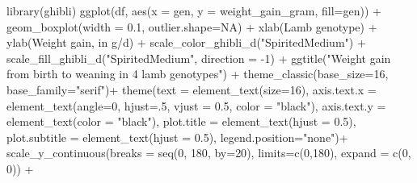 \documentclass[
  letterpaper,
  DIV=11,
  numbers=noendperiod]{scrreprt}
\newenvironment{Shaded}{\begin{snugshade}}{\end{snugshade}}
\newcommand{\AttributeTok}[1]{\textcolor[rgb]{0.40,0.45,0.13}{#1}}
\newcommand{\ConstantTok}[1]{\textcolor[rgb]{0.56,0.35,0.01}{#1}}
\newcommand{\DecValTok}[1]{\textcolor[rgb]{0.68,0.00,0.00}{#1}}
\newcommand{\FloatTok}[1]{\textcolor[rgb]{0.68,0.00,0.00}{#1}}
\newcommand{\FunctionTok}[1]{\textcolor[rgb]{0.28,0.35,0.67}{#1}}
\newcommand{\NormalTok}[1]{\textcolor[rgb]{0.00,0.23,0.31}{#1}}
\newcommand{\SpecialCharTok}[1]{\textcolor[rgb]{0.37,0.37,0.37}{#1}}
\newcommand{\StringTok}[1]{\textcolor[rgb]{0.13,0.47,0.30}{#1}}
\begin{document}
\begin{Shaded}
\begin{Highlighting}[]
\FunctionTok{library}\NormalTok{(ghibli)}
\FunctionTok{ggplot}\NormalTok{(df, }\FunctionTok{aes}\NormalTok{(}\AttributeTok{x =}\NormalTok{ gen, }\AttributeTok{y =}\NormalTok{ weight\_gain\_gram, }\AttributeTok{fill=}\NormalTok{gen)) }\SpecialCharTok{+}
  \FunctionTok{geom\_boxplot}\NormalTok{(}\AttributeTok{width =} \FloatTok{0.1}\NormalTok{, }\AttributeTok{outlier.shape=}\ConstantTok{NA}\NormalTok{) }\SpecialCharTok{+}
  \FunctionTok{xlab}\NormalTok{(}\StringTok{\textquotesingle{}Lamb genotype\textquotesingle{}}\NormalTok{) }\SpecialCharTok{+}
  \FunctionTok{ylab}\NormalTok{(}\StringTok{\textquotesingle{}Weight gain, in g/d\textquotesingle{}}\NormalTok{) }\SpecialCharTok{+}
  \FunctionTok{scale\_color\_ghibli\_d}\NormalTok{(}\StringTok{"SpiritedMedium"}\NormalTok{) }\SpecialCharTok{+}
  \FunctionTok{scale\_fill\_ghibli\_d}\NormalTok{(}\StringTok{"SpiritedMedium"}\NormalTok{, }\AttributeTok{direction =} \SpecialCharTok{{-}}\DecValTok{1}\NormalTok{) }\SpecialCharTok{+}
  \FunctionTok{ggtitle}\NormalTok{(}\StringTok{"Weight gain from birth to weaning in 4 lamb genotypes"}\NormalTok{) }\SpecialCharTok{+}
  \FunctionTok{theme\_classic}\NormalTok{(}\AttributeTok{base\_size=}\DecValTok{16}\NormalTok{, }\AttributeTok{base\_family=}\StringTok{"serif"}\NormalTok{)}\SpecialCharTok{+}
  \FunctionTok{theme}\NormalTok{(}\AttributeTok{text =} \FunctionTok{element\_text}\NormalTok{(}\AttributeTok{size=}\DecValTok{16}\NormalTok{),}
        \AttributeTok{axis.text.x =} \FunctionTok{element\_text}\NormalTok{(}\AttributeTok{angle=}\DecValTok{0}\NormalTok{, }\AttributeTok{hjust=}\NormalTok{.}\DecValTok{5}\NormalTok{, }\AttributeTok{vjust =} \FloatTok{0.5}\NormalTok{, }\AttributeTok{color =} \StringTok{"black"}\NormalTok{),}
        \AttributeTok{axis.text.y =} \FunctionTok{element\_text}\NormalTok{(}\AttributeTok{color =} \StringTok{"black"}\NormalTok{),}
        \AttributeTok{plot.title =} \FunctionTok{element\_text}\NormalTok{(}\AttributeTok{hjust =} \FloatTok{0.5}\NormalTok{),}
        \AttributeTok{plot.subtitle =} \FunctionTok{element\_text}\NormalTok{(}\AttributeTok{hjust =} \FloatTok{0.5}\NormalTok{),}
        \AttributeTok{legend.position=}\StringTok{"none"}\NormalTok{)}\SpecialCharTok{+}
  \FunctionTok{scale\_y\_continuous}\NormalTok{(}\AttributeTok{breaks =} \FunctionTok{seq}\NormalTok{(}\DecValTok{0}\NormalTok{, }\DecValTok{180}\NormalTok{, }\AttributeTok{by=}\DecValTok{20}\NormalTok{), }\AttributeTok{limits=}\FunctionTok{c}\NormalTok{(}\DecValTok{0}\NormalTok{,}\DecValTok{180}\NormalTok{), }\AttributeTok{expand =} \FunctionTok{c}\NormalTok{(}\DecValTok{0}\NormalTok{, }\DecValTok{0}\NormalTok{)) }\SpecialCharTok{+}

\end{Highlighting}
\end{Shaded}
\end{document}
